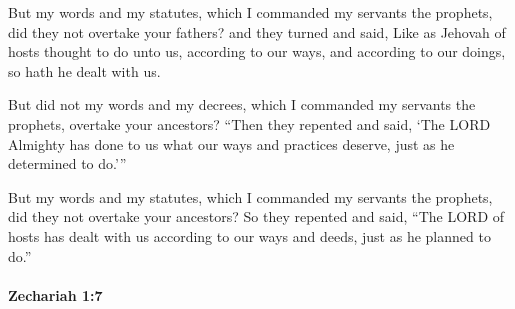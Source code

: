 			\begin{versebox}
					\item[BHS] 
					\item[LXX] 
					\item[ASV] But my words and my statutes, which I commanded my servants the prophets, did they not overtake your fathers? and they turned and said, Like as Jehovah of hosts thought to do unto us, according to our ways, and according to our doings, so hath he dealt with us.
					\item[NIV] But did not my words and my decrees, which I commanded my servants the prophets, overtake your ancestors? “Then they repented and said, ‘The LORD Almighty has done to us what our ways and practices deserve, just as he determined to do.’”
					\item[NRSV] But my words and my statutes, which I commanded my servants the prophets, did they not overtake your ancestors? So they repented and said, “The LORD of hosts has dealt with us according to our ways and deeds, just as he planned to do.”
			\end{versebox}

		\paragraph{Zechariah 1:7} %
			\label{ZECHARIAH-1-7}

